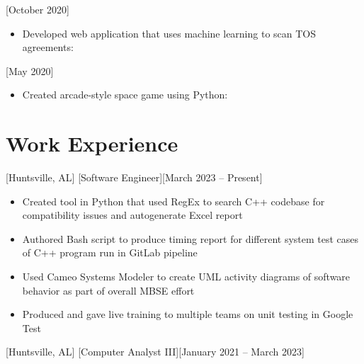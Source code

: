 \documentclass[hidelinks, 11pt]{article}
\begin{document}
[October 2020]

\begin{itemize}
	\item Developed web application that uses machine learning to scan TOS agreements: 
\end{itemize}

[May 2020]

\begin{itemize}
	\item Created arcade-style space game using Python: 
\end{itemize}

\section{Work Experience}

[Huntsville, AL]
[Software Engineer][March 2023 -- Present]

\begin{itemize}
	\item Created tool in Python that used RegEx to search C++ codebase for compatibility issues and autogenerate Excel report
	\item Authored Bash script to produce timing report for different system test cases of C++ program run in GitLab pipeline
	\item Used Cameo Systems Modeler to create UML activity diagrams of software behavior as part of overall MBSE effort
	\item Produced and gave live training to multiple teams on unit testing in Google Test
\end{itemize}

[Huntsville, AL]
[Computer Analyst III][January 2021 -- March 2023]
\end{document}
